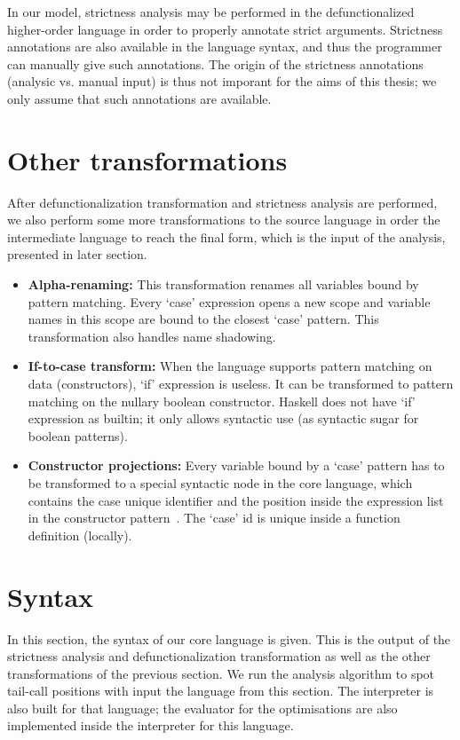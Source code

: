 \documentclass[diploma]{softlab-thesis}
\begin{document}
In our model, strictness analysis may be performed in the
defunctionalized higher-order language in order to properly annotate
strict arguments. Strictness annotations are also available in the
language syntax, and thus the programmer can manually give such
annotations. The origin of the strictness annotations (analysic
vs. manual input) is thus not imporant for the aims of this thesis; we
only assume that such annotations are available.

\section {Other transformations}
\label{sec:other-transformations}

After defunctionalization transformation and strictness analysis are performed, we also 
perform some more transformations to the source language in order the intermediate 
language to reach the final form, which is the input of the analysis, presented in later section.


\begin{itemize}
  \item \textbf{Alpha-renaming:}  This transformation renames all variables bound by pattern matching.
  Every `case' expression opens a new scope and variable names in this scope are bound to the closest 
  `case' pattern. This transformation also handles name shadowing. 
  \item \textbf{If-to-case transform:}  When the language supports pattern matching on data 
  (constructors), `if' expression is useless. It can be transformed to pattern matching on 
  the nullary boolean constructor. Haskell does not have `if' expression as builtin; it only allows
  syntactic use (as syntactic sugar for boolean patterns).
  \item \textbf{Constructor projections:}  Every variable bound by a `case' pattern has to be 
  transformed to a special syntactic node in the core language, which contains the case unique identifier
  and the position inside the expression list in the constructor pattern~\cite{Fourtounis:2013:GIT:2769663.2769674}. The `case' id is 
  unique inside a function definition (locally).
\end{itemize}

\section{Syntax}
\label{sec:syntax}

In this section, the syntax of our core language is given.
This is the output of the strictness analysis and 
defunctionalization transformation as well as the other transformations of the previous 
section. We run the analysis algorithm to spot tail-call positions with input 
the language from this section. The interpreter is also built for that language; the evaluator for 
the optimisations are also implemented inside the interpreter for this language.
\end{document}
